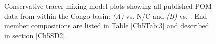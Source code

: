 \begin{figure}[p]
	\caption[Conservative tracer mixing model]{Conservative tracer mixing model plots showing all published POM data from within the Congo basin: \textit{(A)}  vs. N/C and \textit{(B)}  vs. . End-member compositions are listed in Table \ref{Ch5Tab:3} and described in section \ref{Ch5SD2}.}
	\label{Ch5Fig:5} 
\end{figure}

